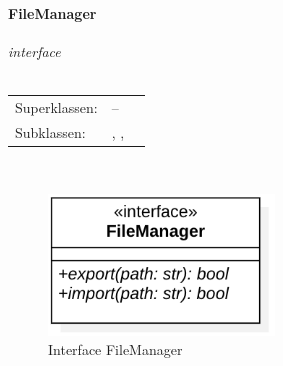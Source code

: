 \documentclass{article}
\newcommand{\classheader}[2][]{\paragraph{#2}
\mbox{}\textit{#1}\\\\}
\newcommand{\classref}[1]{\texttt{\nameref{cls:#1}}}
\begin{document}
\newpage
\classheader[\flqq{}interface\frqq]{FileManager}\label{cls:FileManager}
\begin{tabular}{lll}
 Superklassen: & --\\
 Subklassen: & \classref{ProjectManager}, \classref{FunctionController}, \classref{EvaluationController}
\end{tabular}\\

\begin{figure}[H]%
    \centering
    \includegraphics[width=6cm]{entwurf/Floriane/FileManager.png}
    \caption{Interface FileManager}
\end{figure}
\end{document}

